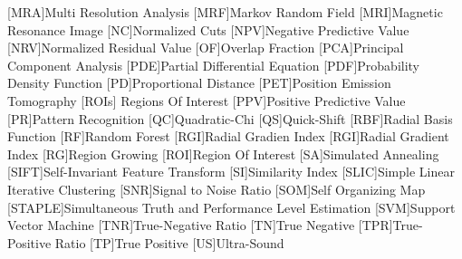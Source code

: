 \begin{acronym}[BI-RADS]
[MRA]{Multi Resolution Analysis}
[MRF]{Markov Random Field}
[MRI]{Magnetic Resonance Image}
[NC]{Normalized Cuts}
[NPV]{Negative Predictive Value}
[NRV]{Normalized Residual Value}
[OF]{Overlap Fraction}
[PCA]{Principal Component Analysis}
[PDE]{Partial Differential Equation}
[PDF]{Probability Density Function}
[PD]{Proportional Distance}
[PET]{Position Emission Tomography}
[ROIs]{ Regions Of Interest}
[PPV]{Positive Predictive Value}
[PR]{Pattern Recognition}
[QC]{Quadratic-Chi}
[QS]{Quick-Shift}
[RBF]{Radial Basis Function}
[RF]{Random Forest}
[RGI]{Radial Gradien Index}
[RGI]{Radial Gradient Index}
[RG]{Region Growing}
[ROI]{Region Of Interest}
[SA]{Simulated Annealing}
[SIFT]{Self-Invariant Feature Transform}
[SI]{Similarity Index}
[SLIC]{Simple Linear Iterative Clustering}
[SNR]{Signal to Noise Ratio}
[SOM]{Self Organizing Map}
[STAPLE]{Simultaneous Truth and Performance Level Estimation}
[SVM]{Support Vector Machine}
[TNR]{True-Negative Ratio}
[TN]{True Negative}
[TPR]{True-Positive Ratio}
[TP]{True Positive}
[US]{Ultra-Sound}
\end{acronym}
